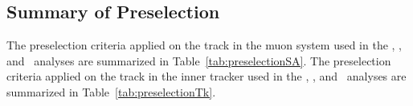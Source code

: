 \subsection{Summary of Preselection \label{sec:summarypreselection}}

The preselection criteria applied on the track in the muon system used in the \muononly, \tktof, and \multi\ analyses are summarized in Table~\ref{tab:preselectionSA}.
The preselection criteria applied on the track in the inner tracker used in the \tktof, \tkonly, and \multi\ analyses are summarized in Table~\ref{tab:preselectionTk}.

